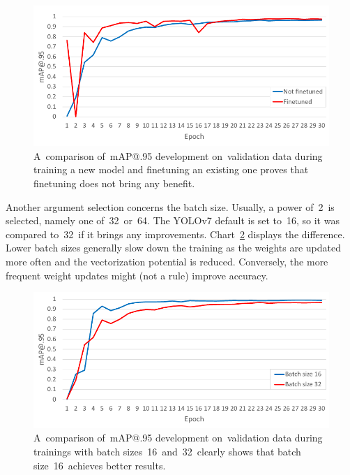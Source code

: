 \vspace{-9pt}
\begin{figure}[hbt]
    \includegraphics[width=1\textwidth]{img/design/nn-finetuned-vs-notfinetuned.pdf}
    \vspace{-20pt}
    \caption{A~comparison of~mAP@.95 development on~validation data during training a new model and finetuning an existing one proves that finetuning does not bring any benefit.}
    \label{nn-finetuned-vs-notfinetuned}
\end{figure}

Another argument selection concerns the batch size. Usually, a power of~2~is selected, namely one of~32~or~64. The YOLOv7 default is set to~16, so it was compared to~32~if it brings any improvements. Chart~\ref{nn-batch-16-vs-32} displays the difference. Lower batch sizes generally slow down the training as the weights are updated more often and the vectorization potential is reduced. Conversely, the more frequent weight updates might (not a rule) improve accuracy.

\vspace{-9pt}
\begin{figure}[!hbt]
    \includegraphics[width=1\textwidth]{img/design/nn-batch-16-vs-32.pdf}
    \vspace{-20pt}
    \caption{A~comparison of~mAP@.95 development on~validation data during trainings with batch sizes~16~and~32~clearly shows that batch size~16~achieves better results.}
    \label{nn-batch-16-vs-32}
\end{figure}

